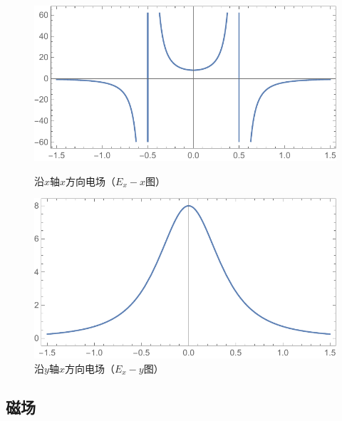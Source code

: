 \begin{figure}[H]
\begin{minipage}[b]{0.4\linewidth}
\centering
\includegraphics[width=\textwidth]{pic_data/Y/Ex-x.pdf}
\caption{沿$x$轴$x$方向电场（$E_x - x$图）}
\end{minipage}
\hfill
\begin{minipage}[b]{0.4\linewidth}
\centering
\includegraphics[width=\textwidth]{pic_data/Y/Ex-y.pdf}
\caption{沿$y$轴$x$方向电场（$E_x - y$图）}
\end{minipage}
\end{figure}

\subsection{磁场}


